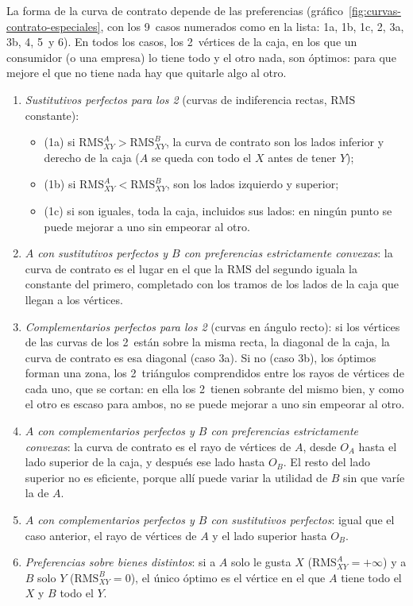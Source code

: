 \documentclass[11pt]{article}
\begin{document}
La forma de la curva de contrato depende de las preferencias (gráfico~\ref{fig:curvas-contrato-especiales}, con los 9~casos numerados como en la lista: 1a, 1b, 1c, 2, 3a, 3b, 4, 5~y 6). En todos los casos, los 2~vértices de la caja, en los que un consumidor (o una empresa) lo tiene todo y el otro nada, son óptimos: para que mejore el que no tiene nada hay que quitarle algo al otro.

\begin{enumerate}
\item \emph{Sustitutivos perfectos para los 2} (curvas de indiferencia rectas, $\mathrm{RMS}$ constante):
  \begin{itemize}
  \item (1a) si $\mathrm{RMS}^A_{XY}>\mathrm{RMS}^B_{XY}$, la curva de contrato son los lados inferior y derecho de la caja ($A$ se queda con todo el $X$ antes de tener $Y$);
  \item (1b) si $\mathrm{RMS}^A_{XY}<\mathrm{RMS}^B_{XY}$, son los lados izquierdo y superior;
  \item (1c) si son iguales, toda la caja, incluidos sus lados: en ningún punto se puede mejorar a uno sin empeorar al otro.
  \end{itemize}
\item \emph{$A$ con sustitutivos perfectos y $B$ con preferencias estrictamente convexas}: la curva de contrato es el lugar en el que la $\mathrm{RMS}$ del segundo iguala la constante del primero, completado con los tramos de los lados de la caja que llegan a los vértices.
\item \emph{Complementarios perfectos para los 2} (curvas en ángulo recto): si los vértices de las curvas de los 2~están sobre la misma recta, la diagonal de la caja, la curva de contrato es esa diagonal (caso 3a). Si no (caso 3b), los óptimos forman una zona, los 2~triángulos comprendidos entre los rayos de vértices de cada uno, que se cortan: en ella los 2~tienen sobrante del mismo bien, y como el otro es escaso para ambos, no se puede mejorar a uno sin empeorar al otro.
\item \emph{$A$ con complementarios perfectos y $B$ con preferencias estrictamente convexas}: la curva de contrato es el rayo de vértices de $A$, desde $O_A$ hasta el lado superior de la caja, y después ese lado hasta $O_B$. El resto del lado superior no es eficiente, porque allí puede variar la utilidad de $B$ sin que varíe la de $A$.
\item \emph{$A$ con complementarios perfectos y $B$ con sustitutivos perfectos}: igual que el caso anterior, el rayo de vértices de $A$ y el lado superior hasta $O_B$.
\item \emph{Preferencias sobre bienes distintos}: si a $A$ solo le gusta $X$ ($\mathrm{RMS}^A_{XY}=+\infty$) y a $B$ solo $Y$ ($\mathrm{RMS}^B_{XY}=0$), el único óptimo es el vértice en el que $A$ tiene todo el $X$ y $B$ todo el $Y$.
\end{enumerate}
\end{document}
